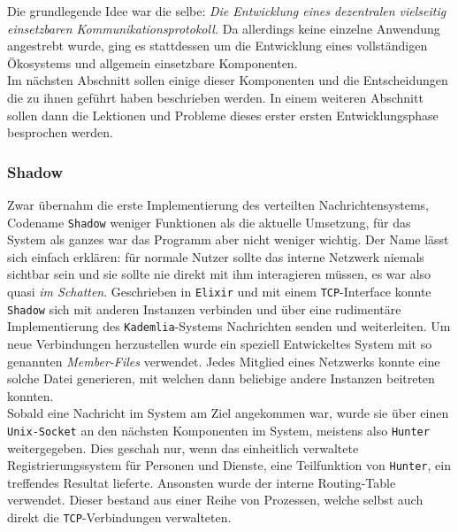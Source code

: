 \documentclass[11pt]{article}
\begin{document}
\noindent Die grundlegende Idee war die selbe: \emph{Die Entwicklung eines
dezentralen vielseitig einsetzbaren Kommunikationsprotokoll.} Da
allerdings keine einzelne Anwendung angestrebt wurde, ging es
stattdessen um die Entwicklung eines vollständigen Ökosystems und
allgemein einsetzbare Komponenten.\\

\noindent Im nächsten Abschnitt sollen einige dieser Komponenten und
die Entscheidungen die zu ihnen geführt haben beschrieben werden. In
einem weiteren Abschnitt sollen dann die Lektionen und Probleme dieses
erster ersten Entwicklungsphase besprochen werden. 
\subsubsection{Shadow}
\label{sec:org2097318}
Zwar übernahm die erste Implementierung des verteilten
Nachrichtensystems, Codename \texttt{Shadow} weniger Funktionen als die
aktuelle Umsetzung, für das System als ganzes war das Programm aber
nicht weniger wichtig. Der Name lässt sich einfach erklären: für
normale Nutzer sollte das interne Netzwerk niemals sichtbar sein und
sie sollte nie direkt mit ihm interagieren müssen, es war also quasi
\emph{im Schatten}. Geschrieben in \texttt{Elixir} und mit einem \texttt{TCP}-Interface konnte
\texttt{Shadow} sich mit anderen Instanzen verbinden und über eine rudimentäre
Implementierung des \texttt{Kademlia}-Systems Nachrichten senden und
weiterleiten. Um neue Verbindungen herzustellen wurde ein speziell
Entwickeltes System mit so genannten \emph{Member-Files} verwendet. Jedes
Mitglied eines Netzwerks konnte eine solche Datei generieren, mit
welchen dann beliebige andere Instanzen beitreten konnten.\\

\noindent Sobald eine Nachricht im System am Ziel angekommen war,
wurde sie über einen \texttt{Unix-Socket} an den nächsten Komponenten im
System, meistens also \texttt{Hunter} weitergegeben. Dies geschah nur, wenn das
einheitlich verwaltete Registrierungssystem für Personen und Dienste,
eine Teilfunktion von \texttt{Hunter}, ein treffendes Resultat lieferte.
Ansonsten wurde der interne Routing-Table verwendet. Dieser bestand
aus einer Reihe von Prozessen, welche selbst auch direkt die
\texttt{TCP}-Verbindungen verwalteten. 
\end{document}
